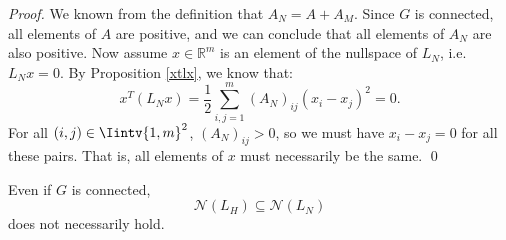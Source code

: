 \begin{proof}
   We known from the definition that $A_N = A + A_M$.
   Since $G$ is connected, all elements of $A$ are positive, and we can conclude that all elements of $A_N$ are also positive.
   Now assume $x \in \mathbb R ^{m}$ is an element of the nullspace of $L_N$, i.e. $L_N x = 0$.
   By Proposition \vref{xtlx}, we know that:
   \begin{equation*}
      x^T (L_N x) = \frac{1}{2} \sum_{i,j=1}^m (A_N)_{ij} (x_i - x_j)^2 = 0.
   \end{equation*}
   For all $(i,j) \in \Iintv{1,m}^2$, $(A_N)_{ij} > 0$, so we must have $x_i - x_j = 0$ for all these pairs.
   That is, all elements of $x$ must necessarily be the same. \qed
\end{proof}

\begin{proposition} \label{spanOfLh}
   Even if $G$ is connected, 
   \begin{equation}
      \mathcal N (L_H) \subseteq \mathcal N (L_N)
   \end{equation}
   does not necessarily hold.
\end{proposition}

